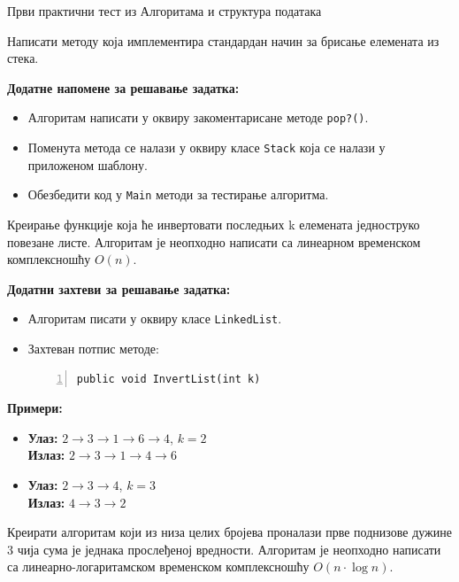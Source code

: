 
Први практични тест из Алгоритама и структура података

Написати методу која имплементира стандардан начин за брисање елемената из стека.

\textbf{Додатне напомене за решавање задатка:}
\begin{itemize}
    \item Алгоритам написати у оквиру закоментарисане методе \texttt{pop?()}.
    \item Поменута метода се налази у оквиру класе \texttt{Stack} која се налази у приложеном шаблону.
    \item Обезбедити код у \texttt{Main} методи за тестирање алгоритма.
\end{itemize}



Креирање функције која ће инвертовати последњих k елемената једноструко повезане листе. Алгоритам је неопходно написати са линеарном временском комплексношћу $O(n)$.

\textbf{Додатни захтеви за решавање задатка:}
\begin{itemize}
    \item Алгоритам писати у оквиру класе \texttt{LinkedList}.
    \item Захтеван потпис методе:
    \begin{Verbatim}[fontsize=\footnotesize, numbers=left, xleftmargin=10mm]
public void InvertList(int k)
    \end{Verbatim}
\end{itemize}

\textbf{Примери:}
\begin{itemize}
    \item \textbf{Улаз:} $2 \rightarrow 3 \rightarrow 1 \rightarrow 6 \rightarrow 4$, $k = 2$ \\
          \textbf{Излаз:} $2 \rightarrow 3 \rightarrow 1 \rightarrow 4 \rightarrow 6$
    \item \textbf{Улаз:} $2 \rightarrow 3 \rightarrow 4$, $k = 3$ \\
          \textbf{Излаз:} $4 \rightarrow 3 \rightarrow 2$
\end{itemize}



Креирати алгоритам који из низа целих бројева проналази прве поднизове дужине 3 чија сума је једнака прослеђеној вредности. Алгоритам је неопходно написати са линеарно-логаритамском временском комплексношћу $O(n \cdot \log n)$.

